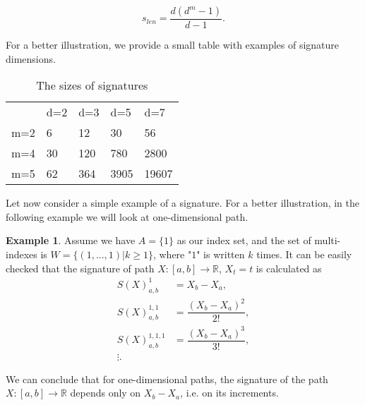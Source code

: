 \documentclass[12pt,a4paper]{report}
\theoremstyle{definition}
\newtheorem{example}{Example}
\begin{document}
\begin{equation}
	s_{len}=\dfrac{d(d^m-1)}{d-1}.
\end{equation}

For a better illustration, we provide a small table with examples of signature dimensions.

\begin{table}[htb]
	\centering
	\begin{tabular}{l|l|l|l|l}
		& \textcolor[rgb]{0.2,0.2,0.2}{d=2} & \textcolor[rgb]{0.2,0.2,0.2}{d=3} & \textcolor[rgb]{0.2,0.2,0.2}{d=5} & \textcolor[rgb]{0.2,0.2,0.2}{d=7}  \\
		\textcolor[rgb]{0.2,0.2,0.2}{m=2} & 6                                 & 12                                & 30                                & 56                                 \\
		\textcolor[rgb]{0.2,0.2,0.2}{m=4} & 30                                & 120                               & 780                               & 2800                               \\
		\textcolor[rgb]{0.2,0.2,0.2}{m=5} & 62                                & 364                               & 3905                              & 19607                             
	\end{tabular}
	\caption{The sizes of signatures}
	\label{SignatureSize}
\end{table}

Let now consider a simple example of a signature. For a better illustration, in the following example we will look at one-dimensional path. 

\begin{example}
	Assume we have $A =\{1\}$ as our index set, and the set of multi-indexes is $W=\{(1,...,1)| k\geq1\}$, where "$1$" is written $k$ times. It can be easily checked that the signature of path $X:[a,b]\rightarrow \mathbb{R}$, $X_t=t$ is calculated as
	\begin{equation}	
			\begin{aligned}
			S(X)_{a,b}^{1}&=X_b-X_a, \\ 
			S(X)_{a,b}^{1,1}&=\dfrac{(X_b-X_a)^2}{2!},\\
			S(X)_{a,b}^{1,1,1}&=\dfrac{(X_b-X_a)^3}{3!},\\ 
			\vdots .			
			\end{aligned}	
	\end{equation}	
\end{example}

We can conclude that for one-dimensional paths, the signature of the path $X:[a,b]\rightarrow\mathbb{R}$ depends only on $X_b-X_a$, i.e. on its increments.
\end{document}
